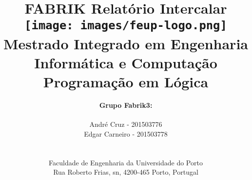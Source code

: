 \documentclass[a4paper]{article}
\begin{document}
\setlength{\textwidth}{16cm}
\setlength{\textheight}{22cm}

\title{\Huge\textbf{FABRIK}\linebreak\linebreak\linebreak
\Large\textbf{Relatório Intercalar}\linebreak\linebreak
\linebreak\linebreak
\texttt{[image: images/feup-logo.png]}\linebreak\linebreak
\linebreak\linebreak
\Large{Mestrado Integrado em Engenharia Informática e Computação} \linebreak\linebreak
\Large{Programação em Lógica}\linebreak
}

\author{\textbf{Grupo Fabrik3:}\\
\linebreak\\
André Cruz - 201503776 \\
Edgar Carneiro - 201503778 \\
\linebreak\linebreak \\
 \\ Faculdade de Engenharia da Universidade do Porto \\ Rua Roberto Frias, s\/n, 4200-465 Porto, Portugal \linebreak\linebreak\linebreak
\linebreak\linebreak\vspace{1cm}}

\maketitle
\thispagestyle{empty}


\newpage
\end{document}
